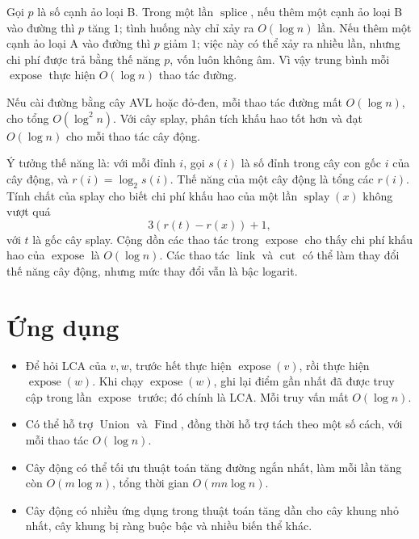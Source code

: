 \documentclass[11pt]{article}
\begin{document}
Gọi \(p\) là số cạnh ảo loại B. Trong một lần \(\operatorname{splice}\), nếu
thêm một cạnh ảo loại B vào đường thì \(p\) tăng \(1\); tình huống này chỉ xảy
ra \(O(\log n)\) lần. Nếu thêm một cạnh ảo loại A vào đường thì \(p\) giảm
\(1\); việc này có thể xảy ra nhiều lần, nhưng chi phí được trả bằng thế năng
\(p\), vốn luôn không âm. Vì vậy trung bình mỗi \(\operatorname{expose}\) thực
hiện \(O(\log n)\) thao tác đường.

Nếu cài đường bằng cây AVL hoặc đỏ-đen, mỗi thao tác đường mất \(O(\log n)\),
cho tổng \(O(\log^2 n)\). Với cây splay, phân tích khấu hao tốt hơn và đạt
\(O(\log n)\) cho mỗi thao tác cây động.

Ý tưởng thế năng là: với mỗi đỉnh \(i\), gọi \(s(i)\) là số đỉnh trong cây con
gốc \(i\) của cây động, và \(r(i)=\log_2 s(i)\). Thế năng của một cây động là
tổng các \(r(i)\). Tính chất của splay cho biết chi phí khấu hao của một lần
\(\operatorname{splay}(x)\) không vượt quá
\[
  3(r(t)-r(x))+1,
\]
với \(t\) là gốc cây splay. Cộng dồn các thao tác trong
\(\operatorname{expose}\) cho thấy chi phí khấu hao của \(\operatorname{expose}\)
là \(O(\log n)\). Các thao tác \(\operatorname{link}\) và
\(\operatorname{cut}\) có thể làm thay đổi thế năng cây động, nhưng mức thay
đổi vẫn là bậc logarit.

\section{Ứng dụng}

\begin{itemize}
  \item {} Để hỏi LCA của \(v,w\), trước hết thực
  hiện \(\operatorname{expose}(v)\), rồi thực hiện \(\operatorname{expose}(w)\).
  Khi chạy \(\operatorname{expose}(w)\), ghi lại điểm gần nhất đã được truy cập
  trong lần \(\operatorname{expose}\) trước; đó chính là LCA. Mỗi truy vấn mất
  \(O(\log n)\).
  \item {} Có thể hỗ trợ \(\operatorname{Union}\) và
  \(\operatorname{Find}\), đồng thời hỗ trợ tách theo một số cách, với mỗi
  thao tác \(O(\log n)\).
  \item {} Cây động có thể tối ưu thuật toán tăng đường
  ngắn nhất, làm mỗi lần tăng còn \(O(m\log n)\), tổng thời gian
  \(O(mn\log n)\).
  \item {} Cây động có nhiều ứng dụng trong thuật toán
  tăng dần cho cây khung nhỏ nhất, cây khung bị ràng buộc bậc và nhiều biến
  thể khác.
\end{itemize}
\end{document}
